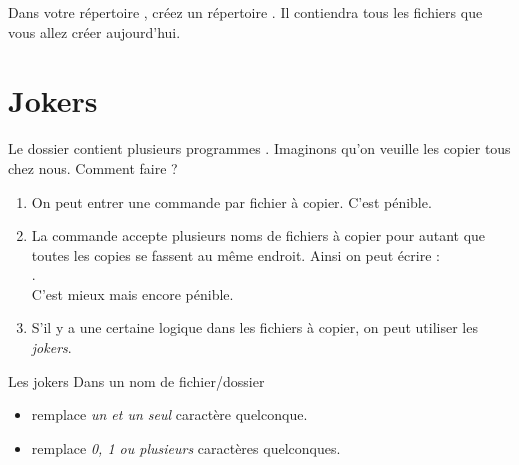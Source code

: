 \documentclass[a4paper,11pt]{style-esi/td}
\begin{document}
\entete
\titre
{}
\lastedit

\bigskip
\tableofcontents

\vfill
\begin{infobox}
    Dans votre répertoire , 
	créez un répertoire . 
    Il contiendra tous les fichiers que vous allez créer aujourd'hui. 
\end{infobox}
\vfill

\newpage

\section{Jokers}

	Le dossier  contient plusieurs programmes .
	Imaginons qu'on veuille les copier tous chez nous. Comment faire ?
	\begin{enumerate}
	\item 
		On peut entrer une commande  par fichier à copier.
		C'est pénible.
	\item 
		La commande  accepte plusieurs noms de fichiers à copier
		pour autant que toutes les copies se fassent au même endroit.
		Ainsi on peut écrire : 
		\\.
		\\C'est mieux mais encore pénible.
	\item
		S'il y a une certaine logique dans les fichiers à copier,
		on peut utiliser les \emph{jokers}.
	\end{enumerate}

	\begin{theorie}{Les jokers}
		Dans un nom de fichier/dossier
		\begin{itemize}
			\item \og{}\fg{} remplace \emph{un et un seul} caractère quelconque.
			\item \og{}\samp{*}\fg{} remplace \emph{0, 1 ou plusieurs} caractères quelconques.
		\end{itemize}
	\end{theorie}
\end{document}
